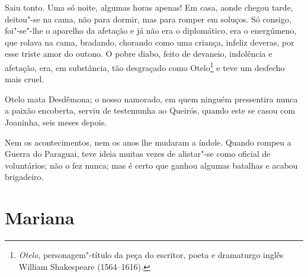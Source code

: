 \begin{linenumbers}
Saiu tonto. Uma só noite, algumas horas apenas! Em casa, aonde chegou
tarde, deitou"-se na cama, não para dormir, mas para romper em soluços.
Só consigo, foi"-se"-lhe o aparelho da afetação e já não era o
diplomático, era o energúmeno, que rolava na cama, bradando, chorando
como uma criança, infeliz deveras, por esse triste amor do outono. O
pobre diabo, feito de devaneio, indolência e afetação, era, em
substância, tão desgraçado como Otelo\footnote{\emph{Otelo},
  personagem"-título da peça do escritor, poeta e dramaturgo inglês
  William Shakespeare (1564--1616).} e teve um
desfecho mais cruel.

Otelo mata Desdêmona; o nosso namorado, em quem ninguém pressentira
nunca a paixão encoberta, serviu de testemunha ao Queirós, quando este
se casou com Joaninha, seis meses depois.

Nem os acontecimentos, nem os anos lhe mudaram a índole. Quando rompeu a
Guerra do Paraguai, teve ideia muitas vezes de alistar"-se como oficial
de voluntários; não o fez nunca; mas é certo que ganhou algumas batalhas
e acabou brigadeiro.

\end{linenumbers}

\chapter{Mariana}

